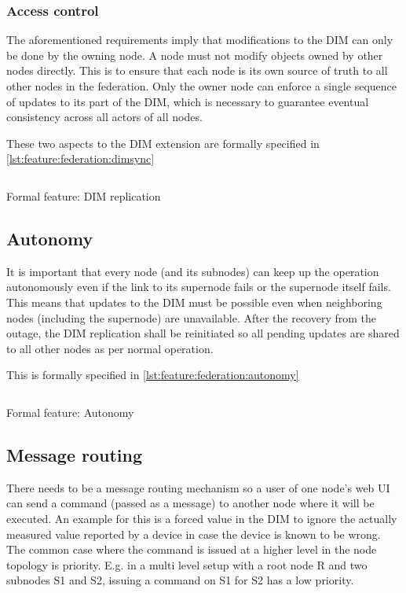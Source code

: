 \subsubsection{Access control}
The aforementioned requirements imply that modifications to the \gls{DIM} can only be done by the
owning node. A node
must not modify objects owned by other nodes directly. This is to ensure that each node is its own source of truth
to all other nodes in the federation. Only the owner node can enforce a single
sequence of updates to its part of the DIM, which is necessary to guarantee
eventual consistency \cite[Chapter 5, Reliable Pub-Sub (Clone Pattern), Republishing
Updates from Clients]{zmq:zguide} across all actors of all nodes.

These two aspects to the DIM extension are formally specified in \autoref{lst:feature:federation:dimsync}

\begin{listing}
	\inputminted{Gherkin}{listings/features/federation/dim_extension.feature}
	\caption{Formal feature: DIM replication}
	\label{lst:feature:federation:dimsync}
\end{listing}

\subsection{Autonomy}
It is important that every node (and its subnodes) can keep up the operation autonomously even if the
link to its supernode fails or the supernode itself fails. This means that updates to
the \gls{DIM} must be possible even when neighboring nodes (including the supernode) are unavailable. After the
recovery from the outage, the \gls{DIM} replication shall be reinitiated so
all pending updates are shared to all other nodes as per normal operation.

This is formally specified in \autoref{lst:feature:federation:autonomy}

\begin{listing}
	\inputminted{Gherkin}{listings/features/federation/autonomy.feature}
	\caption{Formal feature: Autonomy}
	\label{lst:feature:federation:autonomy}
\end{listing}

\subsection{Message routing}
There needs to be a message routing mechanism so a user
of one node's web UI can send a command (passed as a message) to another node where it will be
executed. An example for this is a forced value in the DIM to ignore the
actually measured value reported by a device in case the device is known to be
wrong. The common case where the command is issued at a higher level in the node
topology is priority. E.g. in a multi level setup with a root node R and two
subnodes S1 and S2, issuing a command on S1 for S2 has a low priority.

